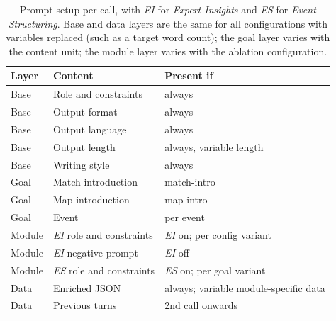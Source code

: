 \documentclass[11pt]{article}
\begin{document}
\begin{table}[h]
  \centering\footnotesize
  \setlength{\tabcolsep}{4pt}
  \begin{tabular}{@{}llp{2.9cm}@{}}
    \toprule
    \textbf{Layer} & \textbf{Content}             & \textbf{Present if} \\
    \midrule
    Base           & Role and constraints           & always \\
    Base           & Output format                  & always \\
    Base           & Output language                & always \\
    Base           & Output length                  & always, variable length \\
    Base           & Writing style                  & always \\
    \addlinespace[2pt]
    Goal           & Match introduction             & match-intro \\
    Goal           & Map introduction               & map-intro \\
    Goal           & Event                          & per event\\
    \addlinespace[2pt]
    Module         & \emph{EI} role and constraints & \emph{EI} on; per config variant \\
    Module         & \emph{EI} negative prompt      & \emph{EI} off \\
    Module         & \emph{ES} role and constraints & \emph{ES} on; per goal variant \\
    \addlinespace[2pt]
    Data           & Enriched JSON                  & always; variable module-specific data \\
    Data           & Previous turns                 & 2nd call onwards \\
    \bottomrule
  \end{tabular}
  \caption{Prompt setup per call, with \emph{EI} for \emph{Expert Insights} and \emph{ES} for \emph{Event Structuring}. Base and data layers are the same for all configurations with variables replaced (such as a target word count); the goal layer varies with the content unit; the module layer varies with the ablation configuration.}
  \label{tab:prompts}
\end{table}
\end{document}
